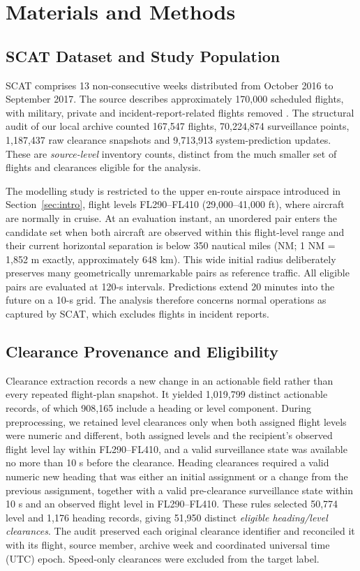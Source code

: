 \documentclass[aerospace,article,submit,moreauthors]{Definitions/mdpi}
\begin{document}
\section{Materials and Methods}\label{sec:methods}
\subsection{SCAT Dataset and Study Population}\label{sec:data}
SCAT comprises 13 non-consecutive weeks distributed from October 2016 to September 2017. The source describes approximately 170,000 scheduled flights, with military, private and incident-report-related flights removed \cite{nilsson2023}. The structural audit of our local archive counted 167,547 flights, 70,224,874 surveillance points, 1,187,437 raw clearance snapshots and 9,713,913 system-prediction updates. These are \emph{source-level} inventory counts, distinct from the much smaller set of flights and clearances eligible for the analysis.

The modelling study is restricted to the upper en-route airspace introduced in Section~\ref{sec:intro}, flight levels FL290--FL410 (29,000--41,000 ft), where aircraft are normally in cruise. At an evaluation instant, an unordered pair enters the candidate set when both aircraft are observed within this flight-level range and their current horizontal separation is below 350 nautical miles (NM; 1 NM = 1,852 m exactly, approximately 648 km). This wide initial radius deliberately preserves many geometrically unremarkable pairs as reference traffic. All eligible pairs are evaluated at 120-s intervals. Predictions extend 20 minutes into the future on a 10-s grid. The analysis therefore concerns normal operations as captured by SCAT, which excludes flights in incident reports.

\subsection{Clearance Provenance and Eligibility}
Clearance extraction records a new change in an actionable field rather than every repeated flight-plan snapshot. It yielded 1,019,799 distinct actionable records, of which 908,165 include a heading or level component. During preprocessing, we retained level clearances only when both assigned flight levels were numeric and different, both assigned levels and the recipient's observed flight level lay within FL290--FL410, and a valid surveillance state was available no more than 10 s before the clearance. Heading clearances required a valid numeric new heading that was either an initial assignment or a change from the previous assignment, together with a valid pre-clearance surveillance state within 10 s and an observed flight level in FL290--FL410. These rules selected 50,774 level and 1,176 heading records, giving 51,950 distinct \emph{eligible heading/level clearances}. The audit preserved each original clearance identifier and reconciled it with its flight, source member, archive week and coordinated universal time (UTC) epoch. Speed-only clearances were excluded from the target label.
\end{document}
